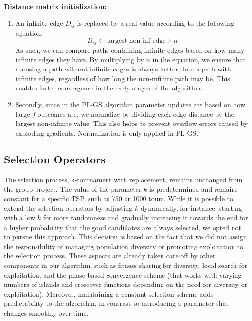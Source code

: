 \documentclass[a4paper,10pt]{article}
\newcommand{\ReplaceMe}[1]{{\color{blue}#1}}
\begin{document}
		
	\textbf{Distance matrix initialization:} 
	\begin{enumerate}
	\item An infinite edge $D_{ij}$ is replaced by a real value according to the following equation:
	$$D_{ij} \leftarrow \text{largest non-inf edge} \times n $$
	As such, we can compare paths containing infinite edges based on how many infinite edges they have. By multiplying by $n$ in the equation, we ensure that choosing a path without infinite edges is always better than a path with infinite edges, regardless of how long the non-infinite path may be. This enables faster convergence in the early stages of the algorithm.
	\item Secondly, since in the PL-GS algorithm parameter updates are based on how large $f$ outcomes are, we normalize by dividing each edge distance by the largest non-infinite value. This also helps to prevent overflow errors caused by exploding gradients. Normalization is only applied in PL-GS.	
	\end{enumerate}




\subsection{Selection Operators}
	The selection process, k-tournament with replacement, remains unchanged from the group project. The value of the parameter $k$ is predetermined and remains constant for a specific TSP, such as 750 or 1000 tours. While it is possible to extend the selection operators by adjusting $k$ dynamically, for instance, starting with a low $k$ for more randomness and gradually increasing it towards the end for a higher probability that the good candidates are always selected, we opted not to pursue this approach. This decision is based on the fact that we did not assign the responsibility of managing population diversity or promoting exploitation to the selection process. These aspects are already taken care off by other components in our algorithm, such as fitness sharing for diversity, local search for exploitation, and the phase-based convergence scheme (that works with varying numbers of islands and crossover functions depending on the need for diversity or exploitation). Moreover, maintaining a constant selection scheme adds predictability to the algorithm, in contrast to introducing a parameter that changes smoothly over time.
\end{document}
